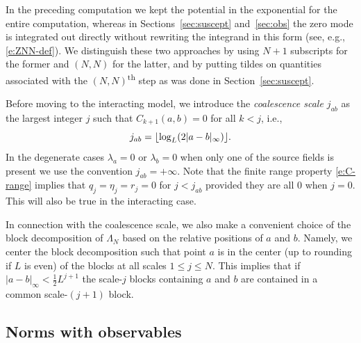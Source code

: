 \documentclass[11pt]{amsart}
\numberwithin{equation}{section}
\numberwithin{theorem}{section}
\newcommand{\1}{{\bf 1}}
\begin{document}
\begin{remark}
  In the preceding computation we kept the potential in the
  exponential for the entire computation, whereas in
  Sections~\ref{sec:suscept} and~\ref{sec:obs} the zero mode is
  integrated out directly without rewriting the integrand in this form
  (see, e.g., \eqref{e:ZNN-def}).  We distinguish these two approaches
  by using $N+1$ subscripts for the former and $(N,N)$ for the latter,
  and by putting tildes on quantities associated with the $(N,N)$\textsuperscript{th}
  step as was done in Section~\ref{sec:suscept}.
\end{remark}


Before moving to the interacting model, we introduce the
\emph{coalescence scale $j_{ab}$} as the largest integer $j$ such that
$C_{k+1}(a,b)=0$ for all $k < j$, i.e.,
\begin{equation} 
\label{E:coal}
  j_{ab} = \lfloor {\log_L (2|a-b|_{{\infty}})} \rfloor.
\end{equation}
In the degenerate cases $\lambda_a=0$ or $\lambda_b=0$ when only one
of the source fields is present we use the convention
$j_{ab}=+\infty$.  Note that the finite range property
\eqref{e:C-range} implies that $q_j=\eta_j=r_{j}=0$ for $j<j_{ab}$
provided they are all $0$ when $j=0$.  This will also be true in the
interacting case.

In connection with the coalescence scale, we also make a convenient
choice of the block decomposition of $\Lambda_{N}$ based on the
relative positions of $a$ and $b$.  Namely, we center the block
decomposition such that point $a$ is in the center (up to rounding if
$L$ is even) of the blocks at all scales $1 \leq j \leq N$.  This
implies that if $|a-b|_\infty < \frac12 L^{j+1}$ the scale-$j$ blocks
containing $a$ and $b$ are contained in a common scale-$(j+1)$ block.




\subsection{Norms with observables}
\end{document}
